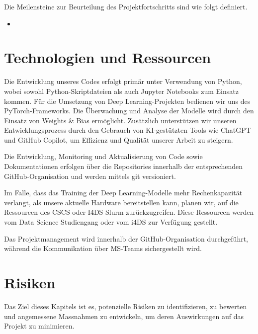 Die Meilensteine zur Beurteilung des Projektfortschritts sind wie folgt definiert.


\begin{itemize}
    \item \textbf{}
\end{itemize}

\section{Technologien und Ressourcen}
Die Entwicklung unseres Codes erfolgt primär unter Verwendung von Python, wobei sowohl Python-Skriptdateien als auch Jupyter Notebooks zum Einsatz kommen. Für die Umsetzung von Deep Learning-Projekten bedienen wir uns des PyTorch-Frameworks. Die Überwachung und Analyse der Modelle wird durch den Einsatz von Weights \& Bias ermöglicht. Zusätzlich unterstützen wir unseren Entwicklungsprozess durch den Gebrauch von KI-gestützten Tools wie ChatGPT und GitHub Copilot, um Effizienz und Qualität unserer Arbeit zu steigern.

Die Entwicklung, Monitoring und Aktualisierung von Code sowie Dokumentationen erfolgen über die Repositories innerhalb der entsprechenden GitHub-Organisation und werden mittels git versioniert.

Im Falle, dass das Training der Deep Learning-Modelle mehr Rechenkapazität verlangt, als unsere aktuelle Hardware bereitstellen kann, planen wir, auf die Ressourcen des CSCS oder I4DS Slurm zurückzugreifen. Diese Ressourcen werden vom Data Science Studiengang oder vom i4DS zur Verfügung gestellt.

Das Projektmanagement wird innerhalb der GitHub-Organisation durchgeführt, während die Kommunikation über MS-Teams sichergestellt wird.

\newpage
\section{Risiken}
Das Ziel dieses Kapitels ist es, potenzielle Risiken zu identifizieren, zu bewerten und angemessene Massnahmen zu entwickeln, um deren Auswirkungen auf das Projekt zu minimieren.

